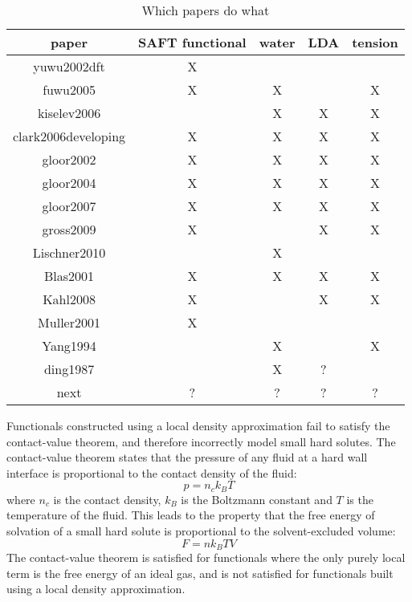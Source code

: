 \documentclass[letterpaper,twocolumn,amsmath,amssymb,prb]{revtex4-1}
\begin{document}
\begin{table}
\begin{tabular}{|c|c|c|c|c|}
\hline
paper & SAFT functional & water & LDA & tension \\
\hline
yuwu2002dft & X & & & \\
\hline
fuwu2005 & X & X & & X \\
\hline
kiselev2006 &  & X & X & X \\
\hline
clark2006developing & X & X & X & X \\
\hline
gloor2002 & X & X & X & X \\
\hline
gloor2004 & X & X & X & X \\
\hline
gloor2007 & X & X & X & X \\
\hline
gross2009 & X &  & X & X \\
\hline
Lischner2010 &  & X &  &  \\
\hline
Blas2001 & X & X & X & X \\
\hline
Kahl2008 & X &  & X & X \\
\hline
Muller2001 & X &  &  &  \\
\hline
Yang1994 &  & X &  & X \\
\hline
ding1987 &  & X & ? &  \\
\hline
next & ? & ? & ? & ? \\
\hline
\end{tabular}
\caption{Which papers do what}
\end{table}

Functionals constructed using a local density approximation
fail to satisfy the contact-value theorem, and
therefore incorrectly model small hard solutes.
The contact-value theorem states that the pressure of any fluid at a
hard wall interface is proportional to the contact density of the
fluid\cite{henderson1979exact}:
\begin{equation}\label{eq:contact}
  p = n_ck_BT
\end{equation}
where $n_c$ is the contact density, $k_B$ is the Boltzmann constant
and $T$ is the temperature of
the fluid. This leads to the property that the free energy of
solvation of a small hard solute is proportional to the
solvent-excluded volume:
\begin{equation}\label{contactvaluethm}
  F = n k_BT V
\end{equation}
The contact-value theorem is satisfied for functionals where the
only purely local term is the free energy of an ideal gas, and is not
satisfied for functionals built using a local density approximation.
\end{document}
